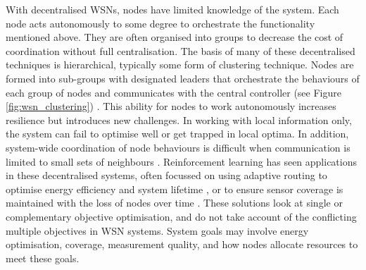 With decentralised WSNs, nodes have limited knowledge of the system. Each node acts autonomously to some degree to orchestrate the functionality mentioned above. They are often organised into groups to decrease the cost of coordination without full centralisation. The basis of many of these decentralised techniques is hierarchical, typically some form of clustering technique. Nodes are formed into sub-groups with designated leaders that orchestrate the behaviours of each group of nodes and communicates with the central controller (see Figure \ref{fig:wsn_clustering}) . This ability for nodes to work autonomously increases resilience but introduces new challenges. In working with local information only, the system can fail to optimise well or get trapped in local optima. In addition, system-wide coordination of node behaviours is difficult when communication is limited to small sets of neighbours \citep{Carlos-Mancilla2016}. Reinforcement learning has seen applications in these decentralised systems, often focussed on using adaptive routing  to optimise energy efficiency and system lifetime \citep{ 10.1504/IJCNDS.2012.048871, Kulkarnib}, or to ensure sensor coverage is maintained with the loss of nodes over time \citep{Sharma2020}. These solutions look at single or complementary objective optimisation, and do not take account of the conflicting multiple objectives in WSN systems. System goals may involve energy optimisation, coverage, measurement quality, and how nodes allocate resources to meet these goals. 

